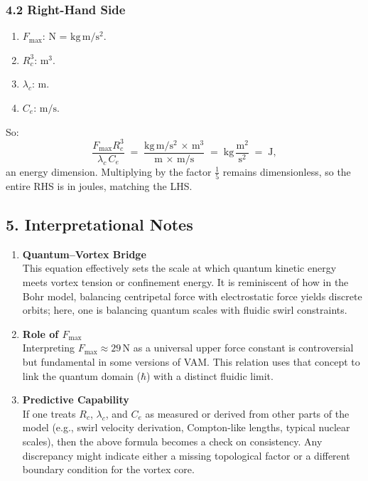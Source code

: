 \documentclass[a4paper,12pt]{article}
\begin{document}
\subsubsection*{4.2 Right-Hand Side}
\begin{enumerate}
    \item \(F_{\max}\): \(\mathrm{N}\) = \(\mathrm{kg\,m/s^2}\).
    \item \(R_c^3\): \(\mathrm{m^3}\).
    \item \(\lambda_c\): \(\mathrm{m}\).
    \item \(C_e\): \(\mathrm{m/s}\).
\end{enumerate}

So:
\[
    \frac{F_{\max} R_c^3}{\lambda_c\,C_e}
    \;=\;
    \frac{\mathrm{kg\,m/s^2}\,\times\,\mathrm{m^3}}{\mathrm{m}\,\times\,\mathrm{m/s}}
    \;=\;
    \mathrm{kg}\,\frac{\mathrm{m^2}}{\mathrm{s^2}}
    \;=\;
    \mathrm{J},
\]
an energy dimension. Multiplying by the factor \(\tfrac{1}{5}\) remains dimensionless, so the entire RHS is in joules, matching the LHS.

\subsection*{5. Interpretational Notes}

\begin{enumerate}
    \item \textbf{Quantum–Vortex Bridge} \\
    This equation effectively sets the scale at which quantum kinetic energy meets vortex tension or confinement energy. It is reminiscent of how in the Bohr model, balancing centripetal force with electrostatic force yields discrete orbits; here, one is balancing quantum scales with fluidic swirl constraints.
    \item \textbf{Role of \(F_{\max}\)} \\
    Interpreting \(F_{\max}\approx 29\,\mathrm{N}\) as a universal upper force constant is controversial but fundamental in some versions of VAM. This relation uses that concept to link the quantum domain (\(\hbar\)) with a distinct fluidic limit.
    \item \textbf{Predictive Capability} \\
    If one treats \(R_c\), \(\lambda_c\), and \(C_e\) as measured or derived from other parts of the model (e.g., swirl velocity derivation, Compton-like lengths, typical nuclear scales), then the above formula becomes a check on consistency. Any discrepancy might indicate either a missing topological factor or a different boundary condition for the vortex core.
\end{enumerate}
\end{document}
